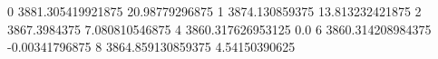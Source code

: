 0 3881.305419921875 20.98779296875
1 3874.130859375 13.813232421875
2 3867.3984375 7.080810546875
4 3860.317626953125 0.0
6 3860.314208984375 -0.00341796875
8 3864.859130859375 4.54150390625
